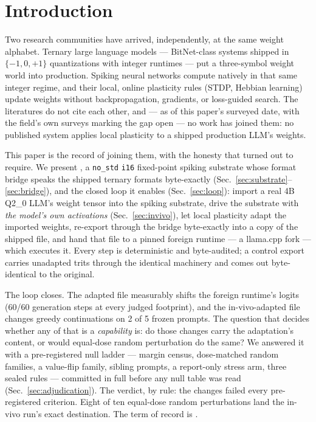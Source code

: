 \section{Introduction}
\label{sec:intro}

Two research communities have arrived, independently, at the same
weight alphabet. Ternary large language models --- BitNet-class
systems shipped in $\{-1, 0, +1\}$ quantizations with integer
runtimes \citep{bitnet158,bitnnetcpp} --- put a three-symbol weight
world into production. Spiking neural networks compute natively in
that same integer regime, and their local, online plasticity rules
(STDP, Hebbian learning) update weights without backpropagation,
gradients, or loss-guided search. The literatures do not cite each
other, and --- as of this paper's surveyed date, with the field's own
surveys marking the gap open \citep{surveylargesnn,rajendran2023future} ---
no work has joined them: no published system applies local plasticity
to a shipped production LLM's weights.

This paper is the record of joining them, with the honesty that
turned out to require. We present \system{}, a
\texttt{no\_std} \texttt{i16} fixed-point spiking substrate whose
format bridge speaks the shipped ternary formats byte-exactly
(Sec.~\ref{sec:substrate}--\ref{sec:bridge}), and the closed loop it
enables (Sec.~\ref{sec:loop}): import a real 4B Q2\_0 LLM's weight
tensor into the spiking substrate, drive the substrate with
\emph{the model's own activations} (Sec.~\ref{sec:invivo}), let local
plasticity adapt the imported weights, re-export through the bridge
byte-exactly into a copy of the shipped file, and hand that file to a
pinned foreign runtime --- a llama.cpp fork --- which executes it.
Every step is deterministic and byte-audited; a control export
carries unadapted trits through the identical machinery and comes out
byte-identical to the original.

The loop closes. The adapted file measurably shifts the foreign
runtime's logits (60/60 generation steps at every judged footprint),
and the in-vivo-adapted file changes greedy continuations on 2 of 5
frozen prompts. The question that decides whether any of that is a
\emph{capability} is: do those changes carry the adaptation's
content, or would equal-dose random perturbation do the same? We
answered it with a pre-registered null ladder --- margin census,
dose-matched random families, a value-flip family, sibling prompts, a
report-only stress arm, three sealed rules --- committed in full
before any null table was read (Sec.~\ref{sec:adjudication}). The
verdict, by rule: the changes failed every pre-registered criterion.
Eight of ten equal-dose random perturbations land the in-vivo run's
exact destination. The term of record is \unattrib{}.


